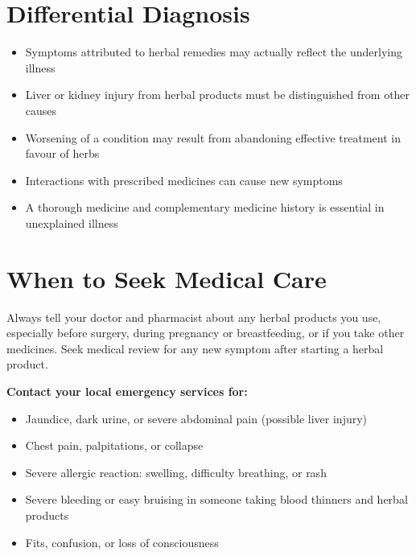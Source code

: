 \section*{Differential Diagnosis}
\begin{itemize}
    \item Symptoms attributed to herbal remedies may actually reflect the underlying illness
    \item Liver or kidney injury from herbal products must be distinguished from other causes
    \item Worsening of a condition may result from abandoning effective treatment in favour of herbs
    \item Interactions with prescribed medicines can cause new symptoms
    \item A thorough medicine and complementary medicine history is essential in unexplained illness
\end{itemize}

\section*{When to Seek Medical Care}
Always tell your doctor and pharmacist about any herbal products you use, especially before surgery, during pregnancy or breastfeeding, or if you take other medicines. Seek medical review for any new symptom after starting a herbal product.

\textbf{Contact your local emergency services for:}
\begin{itemize}
    \item Jaundice, dark urine, or severe abdominal pain (possible liver injury)
    \item Chest pain, palpitations, or collapse
    \item Severe allergic reaction: swelling, difficulty breathing, or rash
    \item Severe bleeding or easy bruising in someone taking blood thinners and herbal products
    \item Fits, confusion, or loss of consciousness
\end{itemize}


